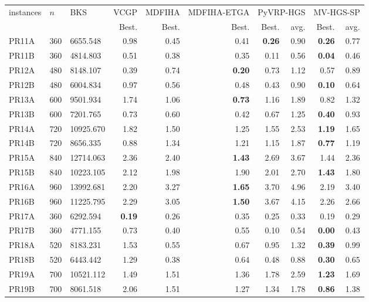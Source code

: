 \begin{tabular}{@{}lllrrrrrrr@{}}
\toprule
instances & $n$ & BKS & VCGP & MDFIHA & MDFIHA-ETGA & \multicolumn{2}{c}{PyVRP-HGS} & \multicolumn{2}{c}{MV-HGS-SP}\\
 &  &  & Best. & Best. & Best. & Best. & avg. & Best. & avg.\\
\midrule
PR11A & 360 & 6655.548 & 0.98 & 0.45 & 0.41 & \textbf{0.26} & 0.90 & \textbf{0.26} & 0.77 \\
PR11B & 360 & 4814.803 & 0.51 & 0.38 & 0.35 & 0.11 & 0.56 & \textbf{0.04} & 0.46 \\
PR12A & 480 & 8148.107 & 0.39 & 0.74 & \textbf{0.20} & 0.73 & 1.12 & 0.57 & 0.89 \\
PR12B & 480 & 6004.834 & 0.97 & 0.56 & 0.48 & 0.43 & 0.90 & \textbf{0.10} & 0.64 \\
PR13A & 600 & 9501.934 & 1.74 & 1.06 & \textbf{0.73} & 1.16 & 1.89 & 0.82 & 1.32 \\
PR13B & 600 & 7201.765 & 0.73 & 0.60 & 0.42 & 0.67 & 1.25 & \textbf{0.40} & 0.93 \\
PR14A & 720 & 10925.670 & 1.82 & 1.50 & 1.25 & 1.55 & 2.53 & \textbf{1.19} & 1.65 \\
PR14B & 720 & 8656.335 & 0.88 & 1.34 & 1.21 & 1.15 & 1.87 & \textbf{0.77} & 1.19 \\
PR15A & 840 & 12714.063 & 2.36 & 2.40 & \textbf{1.43} & 2.69 & 3.67 & 1.44 & 2.36 \\
PR15B & 840 & 10223.105 & 2.12 & 1.98 & 1.90 & 2.01 & 2.70 & \textbf{1.43} & 1.80 \\
PR16A & 960 & 13992.681 & 2.20 & 3.27 & \textbf{1.65} & 3.70 & 4.96 & 2.19 & 3.40 \\
PR16B & 960 & 11225.795 & 2.29 & 3.05 & \textbf{1.50} & 3.67 & 4.15 & 2.26 & 2.66 \\
PR17A & 360 & 6292.594 & \textbf{0.19} & 0.26 & 0.35 & 0.25 & 0.33 & 0.19 & 0.29 \\
PR17B & 360 & 4771.155 & 0.73 & 0.40 & 0.55 & 0.10 & 0.54 & \textbf{0.00} & 0.43 \\
PR18A & 520 & 8183.231 & 1.53 & 0.55 & 0.67 & 0.95 & 1.32 & \textbf{0.39} & 0.99 \\
PR18B & 520 & 6443.442 & 1.29 & 0.38 & 0.64 & 0.48 & 0.88 & \textbf{0.30} & 0.65 \\
PR19A & 700 & 10521.112 & 1.49 & 1.51 & 1.36 & 1.78 & 2.59 & \textbf{1.23} & 1.69 \\
PR19B & 700 & 8061.518 & 2.06 & 1.51 & 1.27 & 1.34 & 1.78 & \textbf{0.86} & 1.38 \\

\end{tabular}
